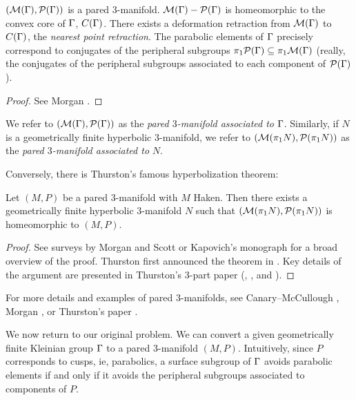 \begin{prop}

$(\mathcal{M}(\Gamma),\mathcal{P}(\Gamma))$ is a pared $3$-manifold. $\mathcal{M}(\Gamma)- \mathcal{P}(\Gamma)$ is
homeomorphic to the convex core of $\Gamma$, $C(\Gamma)$. There exists a deformation
retraction from $\mathcal{M}(\Gamma)$ to $C(\Gamma)$, the \emph{nearest point retraction}.
The parabolic elements of $\Gamma$ precisely correspond to conjugates of the
peripheral subgroups $\pi_1\mathcal{P}(\Gamma) \subseteq \pi_1\mathcal{M}(\Gamma)$ (really, the conjugates
of the peripheral subgroups associated to each component of $\mathcal{P}(\Gamma)$).

\end{prop}

\begin{proof}

See Morgan \cite[Lemma 6.1 and Corollary 6.10]{Mo}. %

\end{proof}

We refer to $(\mathcal{M}(\Gamma),\mathcal{P}(\Gamma))$ as the \emph{pared $3$-manifold associated
to} $\Gamma$.  Similarly, if $N$ is a geometrically finite hyperbolic
$3$-manifold, we refer to $(\mathcal{M}(\pi_1N),\mathcal{P}(\pi_1N))$ as the \emph{pared
$3$-manifold associated to} $N$.

Conversely, there is Thurston's famous hyperbolization theorem:

\begin{thm}

Let $(M,P)$ be a pared $3$-manifold with $M$ Haken. Then there exists
a geometrically finite hyperbolic $3$-manifold $N$ such that
$(\mathcal{M}(\pi_1N),\mathcal{P}(\pi_1N))$ is homeomorphic to $(M,P)$.

\end{thm}

\begin{proof}

See surveys by Morgan \cite{Mo} and Scott \cite{ThurstonviaScott} or Kapovich's
monograph \cite{Kapovich} for a broad overview of the proof. Thurston first
announced the theorem in \cite{Thurston0}. Key details of the argument are
presented in Thurston's 3-part paper (\cite{ThurstonI}, \cite{ThurstonII}, and
\cite{ThurstonIII}).

\end{proof}

For more details and examples of pared $3$-manifolds, see Canary--McCullough
\cite{CMc}, Morgan \cite{Mo}, or Thurston's paper \cite{ThurstonI}.

We now return to our original problem. We can convert a given geometrically
finite Kleinian group $\Gamma$ to a pared $3$-manifold $(M,P)$. Intuitively, since
$P$ corresponds to cusps, ie, parabolics, a surface subgroup of $\Gamma$ avoids
parabolic elements if and only if it avoids the peripheral subgroups associated
to components of $P$.

